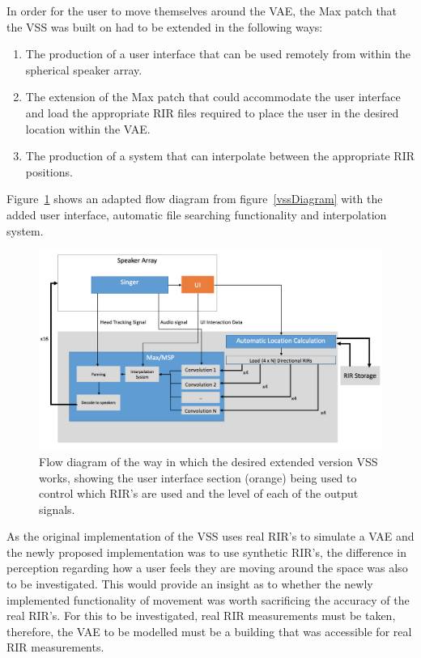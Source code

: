 \documentclass[../../main.tex]{subfiles}
\begin{document}
		In order for the user to move themselves around the \ac{VAE}, the Max patch that the \ac{VSS} was built on had to be extended in the following ways:

		\begin{enumerate}

			\item The production of a user interface that can be used remotely from within the spherical speaker array. \\

			\item The extension of the Max patch that could accommodate the user interface and load the appropriate \ac{RIR} files required to place the user in the desired location within the \ac{VAE}. \\

			\item The production of a system that can interpolate between the appropriate \ac{RIR} positions.

		\end{enumerate}

		Figure~\ref{vssExtention} shows an adapted flow diagram from figure~\ref{vssDiagram} with the added user interface, automatic file searching functionality and interpolation system.

		\begin{figure}
			\centerline{\includegraphics[width=\textwidth]{Sections/Background/images/vssExtention2.png}}
			\caption{Flow diagram of the way in which the desired extended version VSS works, showing the user interface section (orange) being used to control which RIR's are used and the level of each of the output signals.}
			\label{vssExtention}
		\end{figure}

		As the original implementation of the \ac{VSS} uses real \ac{RIR}'s to simulate a \ac{VAE} and the newly proposed implementation was to use synthetic \ac{RIR}'s, the difference in perception regarding how a user feels they are moving around the space was also to be investigated. This would provide an insight as to whether the newly implemented functionality of movement was worth sacrificing the accuracy of the real \ac{RIR}'s. For this to be investigated, real \ac{RIR} measurements must be taken, therefore, the \ac{VAE} to be modelled must be a building that was accessible for real \ac{RIR} measurements.
\end{document}
